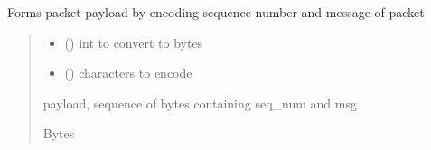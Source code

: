 \documentclass[letterpaper,10pt,oneside,english,openany]{sphinxmanual}
\begin{document}

\begin{fulllineitems}
\label{\detokenize{modules:receiver_rdt.make_receiver_payload}}
\pysigstartsignatures
\pysiglinewithargsret
{}
{\sphinxparamcomma {}}
{}
\pysigstopsignatures
\sphinxAtStartPar
Forms packet payload by encoding sequence number and message of packet
\begin{quote}\begin{description}
\begin{itemize}
\item {} 
\sphinxAtStartPar
{} () \textendash{} int to convert to bytes

\item {} 
\sphinxAtStartPar
{} () \textendash{} characters to encode

\end{itemize}

\sphinxAtStartPar
payload, sequence of bytes containing seq\_num and msg

\sphinxAtStartPar
Bytes

\end{description}\end{quote}

\end{fulllineitems}

\end{document}
